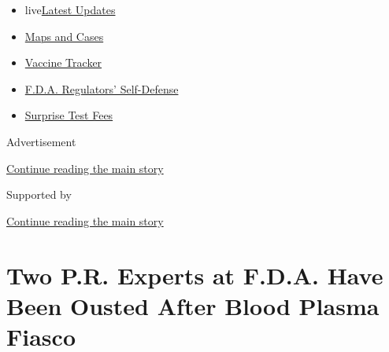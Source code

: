 \begin{itemize}
\tightlist
\item
  live\href{https://www.nytimes3xbfgragh.onion/2020/09/12/world/covid-19-coronavirus.html?name=styln-coronavirus-national\&region=TOP_BANNER\&block=storyline_menu_recirc\&action=click\&pgtype=Article\&impression_id=e864c3c1-f52e-11ea-9589-49e10d004492\&variant=undefined}{Latest
  Updates}
\item
  \href{https://www.nytimes3xbfgragh.onion/interactive/2020/us/coronavirus-us-cases.html?name=styln-coronavirus-national\&region=TOP_BANNER\&block=storyline_menu_recirc\&action=click\&pgtype=Article\&impression_id=e864c3c2-f52e-11ea-9589-49e10d004492\&variant=undefined}{Maps
  and Cases}
\item
  \href{https://www.nytimes3xbfgragh.onion/interactive/2020/science/coronavirus-vaccine-tracker.html?name=styln-coronavirus-national\&region=TOP_BANNER\&block=storyline_menu_recirc\&action=click\&pgtype=Article\&impression_id=e864ead0-f52e-11ea-9589-49e10d004492\&variant=undefined}{Vaccine
  Tracker}
\item
  \href{https://www.nytimes3xbfgragh.onion/2020/09/10/us/politics/fda-coronavirus-vaccine.html?name=styln-coronavirus-national\&region=TOP_BANNER\&block=storyline_menu_recirc\&action=click\&pgtype=Article\&impression_id=e864ead1-f52e-11ea-9589-49e10d004492\&variant=undefined}{F.D.A.
  Regulators' Self-Defense}
\item
  \href{https://www.nytimes3xbfgragh.onion/2020/09/09/upshot/coronavirus-surprise-test-fees.html?name=styln-coronavirus-national\&region=TOP_BANNER\&block=storyline_menu_recirc\&action=click\&pgtype=Article\&impression_id=e864ead2-f52e-11ea-9589-49e10d004492\&variant=undefined}{Surprise
  Test Fees}
\end{itemize}

Advertisement

\protect\hyperlink{after-top}{Continue reading the main story}

Supported by

\protect\hyperlink{after-sponsor}{Continue reading the main story}

\hypertarget{two-pr-experts-at-fda-have-been-ousted-after-blood-plasma-fiasco}{%
\section{Two P.R. Experts at F.D.A. Have Been Ousted After Blood Plasma
Fiasco}\label{two-pr-experts-at-fda-have-been-ousted-after-blood-plasma-fiasco}}


